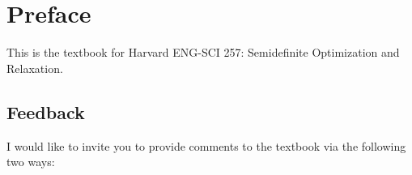\documentclass[
]{book}
\theoremstyle{definition}
\theoremstyle{definition}
\theoremstyle{definition}
\theoremstyle{definition}
\theoremstyle{remark}
\begin{document}
\newcommand{\cbrace}[1]{\{ #1 \}}
\newcommand{\lcbrace}[1]{ \left\{ #1 \right\} }
\newcommand{\aff}{\mathrm{aff}}
\newcommand{\bbN}{\mathbb{N}}
\newcommand{\dist}{\mathrm{dist}}
\newcommand{\subject}{\mathrm{s.t.}}
\newcommand{\cl}{\mathrm{cl}}
\newcommand{\eye}{\mathrm{I}}
\newcommand{\inv}{^{-1}}
\newcommand{\invtran}{^{-\top}}
\newcommand{\Range}{\mathrm{Range}}
\renewcommand{\ker}{\mathrm{ker}}
\newcommand{\face}{\mathrm{face}}
\newcommand{\lmid}{\ \middle\vert\ }
\renewcommand{\Re}{\mathrm{Re}}
\newcommand{\hatmap}[1]{[#1]_{\times}}
\newcommand{\kron}{\otimes}
\newcommand{\skron}{\kron_{\mathrm{s}}}
\newcommand{\Ideal}{\mathrm{Ideal}}
\newcommand{\lexsucc}{\succ_{\mathrm{lex}}}
\newcommand{\lexprec}{\prec_{\mathrm{lex}}}
\newcommand{\grlexsucc}{\succ_{\mathrm{grlex}}}
\newcommand{\grlexprec}{\prec_{\mathrm{grlex}}}
\newcommand{\grevlexsucc}{\succ_{\mathrm{grevlex}}}
\newcommand{\grevlexprec}{\prec_{\mathrm{grevlex}}}
\newcommand{\abs}[1]{|#1|}
\newcommand{\initial}[1]{\mathrm{in}(#1)}
\newcommand{\NormalForm}{\mathrm{NormalForm}}
\newcommand{\ceil}[1]{\lceil #1 \rceil}
\newcommand{\floor}[1]{\lfloor #1 \rfloor}

\newcommand{\qmodule}{\mathrm{Qmodule}}
\newcommand{\mom}{\mathrm{mom}}
\newcommand{\loc}{\mathrm{loc}}
\newcommand{\preorder}{\mathrm{Preorder}}
\newcommand{\supp}{\mathrm{supp}}
\newcommand{\myspan}{\mathrm{span}}

\chapter*{Preface}\label{preface}

This is the textbook for Harvard ENG-SCI 257: Semidefinite Optimization and Relaxation.

\section*{Feedback}\label{feedback}

I would like to invite you to provide comments to the textbook via the following two ways:
\end{document}
